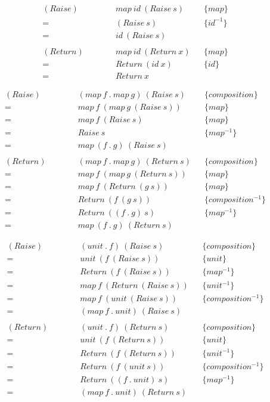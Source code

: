 \begin{framed}
  \begin{align*}
      (Raise)\qquad
      &\quad map\ id\ (Raise\  s) && \{map\}\\
      =&\quad (Raise\ s) && \{id^{-1}\}\\
      =&\quad id\ (Raise\ s)\\\\
      (Return)\qquad
      &\quad map\ id\ (Return\ x) && \{map\}\\
      =&\quad Return\ (id\ x) && \{id\}\\
      =&\quad Return\ x
  \end{align*}

  \begin{align*}
      (Raise)\qquad
      &\quad (map\ f\ .\ map\ g)\ (Raise\ s) && \{composition\}\\
      =&\quad map\ f\ (map\ g\ (Raise\ s)) && \{map\}\\
      =&\quad map\ f\ (Raise\ s) && \{map\}\\
      =&\quad Raise\ s && \{map^{-1}\}\\
      =&\quad map\ (f\ .\  g)\ (Raise\ s)\\\\
      (Return)\qquad
      &\quad (map\ f\ .\ map\ g)\ (Return\ s) && \{composition\}\\
      =&\quad map\ f\ (map\ g\ (Return\ s)) && \{map\}\\
      =&\quad map\ f\ (Return\ (g\ s)) && \{map\}\\
      =&\quad Return\ (f\ (g\ s)) && \{composition^{-1}\}\\
      =&\quad Return\ ((f\ .\ g)\ s) && \{map^{-1}\}\\
      =&\quad map\ (f\ .\  g)\ (Return\ s)
  \end{align*}

  \begin{align*}
      (Raise)\qquad
      &\quad (unit\ .\ f)\ (Raise\ s) && \{composition\}\\
      =&\quad unit\ (f\ (Raise\ s)) &&\{unit\}\\
      =&\quad Return\ (f\ (Raise\ s)) && \{map^{-1}\} \\
      =&\quad map\ f\ (Return\ (Raise\ s)) && \{unit^{-1}\} \\
      =&\quad map\ f\ (unit\ (Raise\ s)) && \{composition^{-1}\} \\
      =&\quad (map\ f\ .\ unit)\ (Raise\ s)\ \\\\
      (Return)\qquad
      &\quad (unit\ .\ f)\ (Return\ s) && \{composition\}\\
      =&\quad unit\ (f\ (Return\ s)) &&\{unit\}\\
      =&\quad Return\ (f\ (Return\ s)) && \{unit^{-1}\} \\
      =&\quad Return\ (f\ (unit\ s)) && \{composition^{-1}\} \\
      =&\quad Return\ ((f\ .\ unit)\ s) && \{map^{-1}\} \\
      =&\quad (map\ f\ .\ unit)\ (Return\ s)\
  \end{align*}


\end{framed}
